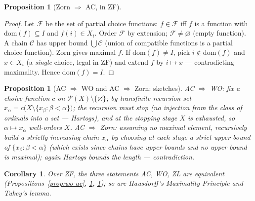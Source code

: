 \documentclass[11pt,a4paper]{article}
\newtheorem{proposition}[theorem]{Proposition}
\newtheorem{corollary}[theorem]{Corollary}
\theoremstyle{definition}
\newcommand{\Pow}{\mathcal{P}}
\begin{document}
\begin{proposition}[Zorn $\Rightarrow$ AC, in ZF]\label{prop:zorn-ac}
\end{proposition}
\begin{proof}
Let $\mathcal F$ be the set of partial choice functions: $f\in\mathcal F$ iff $f$ is a function with
$\mathrm{dom}(f)\subseteq I$ and $f(i)\in X_i$. Order $\mathcal F$ by extension; $\mathcal F\neq\varnothing$
(empty function). A chain $\mathcal C$ has upper bound $\bigcup\mathcal C$ (union of compatible
functions is a partial choice function). Zorn gives maximal $f$. If $\mathrm{dom}(f)\neq I$, pick
$i\notin\mathrm{dom}(f)$ and $x\in X_i$ (a \emph{single} choice, legal in ZF) and extend $f$ by
$i\mapsto x$ --- contradicting maximality. Hence $\mathrm{dom}(f)=I$.
\end{proof}

\begin{proposition}[AC $\Rightarrow$ WO and AC $\Rightarrow$ Zorn: sketches]\label{prop:ac-wo-zorn}
\emph{AC $\Rightarrow$ WO:} fix a choice function $c$ on $\Pow(X)\setminus\{\varnothing\}$; by
transfinite recursion set $x_\alpha=c\big(X\setminus\{x_\beta:\beta<\alpha\}\big)$; the recursion must
stop (no injection from the class of ordinals into a set --- Hartogs), and at the stopping stage $X$
is exhausted, so $\alpha\mapsto x_\alpha$ well-orders $X$. \emph{AC $\Rightarrow$ Zorn:} assuming no
maximal element, recursively build a strictly increasing chain $x_\alpha$ by choosing at each stage
a strict upper bound of $\{x_\beta:\beta<\alpha\}$ (which exists since chains have upper bounds and
no upper bound is maximal); again Hartogs bounds the length --- contradiction.
\end{proposition}

\begin{corollary}
Over ZF, the three statements AC, WO, ZL are equivalent (Propositions~\ref{prop:wo-ac},
\ref{prop:zorn-ac}, \ref{prop:ac-wo-zorn}); so are Hausdorff's Maximality Principle and Tukey's lemma.
\end{corollary}
\end{document}
